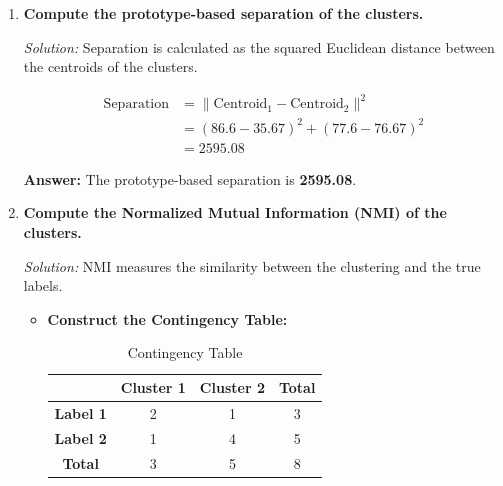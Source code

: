 \documentclass{article}
\begin{document}
\begin{enumerate}[label=(\roman*)]
    \item \textbf{Compute the prototype-based separation of the clusters.}

    \textit{Solution:} Separation is calculated as the squared Euclidean distance between the centroids of the clusters.

    \[
    \begin{split}
        \text{Separation} &= \| \text{Centroid}_1 - \text{Centroid}_2 \|^2 \\
        &= (86.6 - 35.67)^2 + (77.6 - 76.67)^2 \\
        &= 2595.08
    \end{split}
    \]

    \textbf{Answer:} The prototype-based separation is \textbf{2595.08}.

    \item \textbf{Compute the Normalized Mutual Information (NMI) of the clusters.}

    \textit{Solution:} NMI measures the similarity between the clustering and the true labels.

    \begin{itemize}
        \item \textbf{Construct the Contingency Table:}

        \begin{table}[H]
        \centering
        \caption{Contingency Table}
        \begin{tabular}{c|cc|c}
        \toprule
        & \textbf{Cluster 1} & \textbf{Cluster 2} & \textbf{Total} \\
        \midrule
        \textbf{Label 1} & 2 & 1 & 3 \\
        \textbf{Label 2} & 1 & 4 & 5 \\
        \midrule
        \textbf{Total} & 3 & 5 & 8 \\
        \bottomrule
        \end{tabular}
        \end{table}


\end{itemize}
\end{enumerate}
\end{document}
